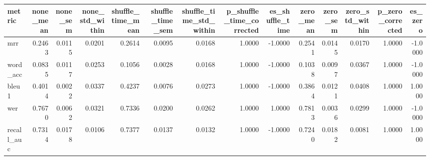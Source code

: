 \begin{tabular}{lrrrrrrrrrrrrr}
\toprule
metric & none_mean & none_sem & none_std_within & shuffle_time_mean & shuffle_time_sem & shuffle_time_std_within & p_shuffle_time_corrected & es_shuffle_time & zero_mean & zero_sem & zero_std_within & p_zero_corrected & es_zero \\
\midrule
mrr & 0.2463 & 0.0115 & 0.0201 & 0.2614 & 0.0095 & 0.0168 & 1.0000 & -1.0000 & 0.2541 & 0.0145 & 0.0170 & 1.0000 & -1.0000 \\
word_acc & 0.0835 & 0.0117 & 0.0253 & 0.1056 & 0.0028 & 0.0168 & 1.0000 & -1.0000 & 0.1038 & 0.0097 & 0.0367 & 1.0000 & -1.0000 \\
bleu1 & 0.4014 & 0.0022 & 0.0337 & 0.4237 & 0.0076 & 0.0273 & 1.0000 & -1.0000 & 0.3864 & 0.0121 & 0.0408 & 1.0000 & 1.0000 \\
wer & 0.7670 & 0.0062 & 0.0321 & 0.7336 & 0.0200 & 0.0262 & 1.0000 & 1.0000 & 0.7813 & 0.0036 & 0.0299 & 1.0000 & -1.0000 \\
recall_auc & 0.7314 & 0.0178 & 0.0106 & 0.7377 & 0.0137 & 0.0132 & 1.0000 & -1.0000 & 0.7240 & 0.0182 & 0.0081 & 1.0000 & 1.0000 \\
\bottomrule
\end{tabular}
